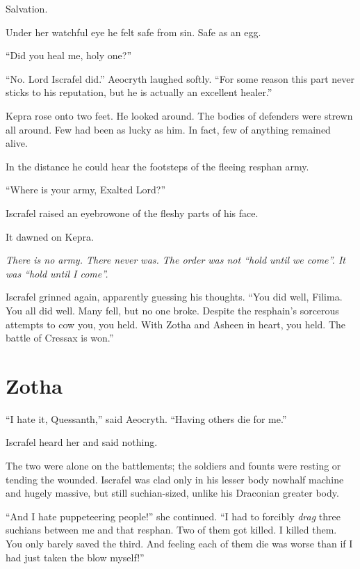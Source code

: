 \documentclass
  [a4paper,
   12pt,
   oneside
  ]%
  {article}
\begin{document}
Salvation.

Under her watchful eye he felt safe from sin. Safe as an egg.

``Did you heal me, holy one?''

``No. Lord Iscrafel did.'' Aeocryth laughed softly. 
``For some reason this part never sticks to his reputation, but he is actually an excellent healer.''

Kepra rose onto two feet. He looked around. 
The bodies of defenders were strewn all around. 
Few had been as lucky as him. 
In fact, few of anything remained alive. 

In the distance he could hear the footsteps of the fleeing resphan army. 

``Where is your army, Exalted Lord?''

Iscrafel raised an eyebrow\dash{}one of the fleshy parts of his face.

It dawned on Kepra. 

\emph{%
    There is no army. There never was. The order was not ``hold until we come''. It was ``hold until I come''.}

Iscrafel grinned again, apparently guessing his thoughts. ``You did well, Filima. You all did well. Many fell, but no one broke. Despite the resphain's sorcerous attempts to cow you, you held. With Zotha and Asheen in heart, you held. The battle of Cressax is won.''



\section{Zotha}
``I hate it, Quessanth,'' said Aeocryth. ``Having others die for me.''

Iscrafel heard her and said nothing. 

The two were alone on the battlements; the soldiers and founts were resting or tending the wounded.
Iscrafel was clad only in his lesser body now\dash{}half machine and hugely massive, but still suchian-sized, unlike his Draconian greater body. 

``And I hate puppeteering people!'' she continued. 
``I had to forcibly \emph{drag} three suchians between me and that resphan. Two of them got killed. I killed them. You only barely saved the third. And feeling each of them die was worse than if I had just taken the blow myself!''
\end{document}
